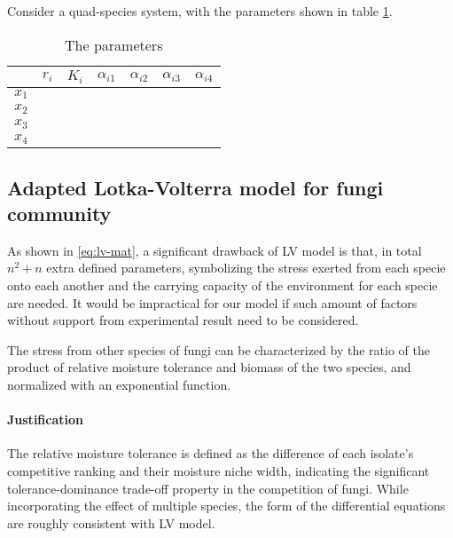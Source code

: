 Consider a quad-species system, with the parameters shown in table \ref{tb:quad-para}.

\begin{table}
    \begin{center}
        \caption{The parameters}
        \begin{tabular}{c|cccccc}
            \toprule
                  & $r_i$ & $K_i$ & $\alpha_{i1}$ & $\alpha_{i2}$ & $\alpha_{i3}$ & $\alpha_{i4}$ \\
            \midrule
            $x_1$ &       &       &               &               &               &               \\
            $x_2$ &       &       &               &               &               &               \\
            $x_3$ &       &       &               &               &               &               \\
            $x_4$ &       &       &               &               &               &               \\
            \bottomrule
        \end{tabular}\label{tb:quad-para}
    \end{center}
\end{table}



\subsection{Adapted Lotka-Volterra model for fungi community}

As shown in \eqref{eq:lv-mat}, a significant drawback of LV model is that, in total $n^2 + n$ extra defined parameters, symbolizing the stress exerted from each specie onto each another and the carrying capacity of the environment for each specie are needed. It would be impractical for our model if such amount of factors without support from experimental result need to be considered.

\begin{definition}
    The stress from other species of fungi can be characterized by the ratio of the product of relative moisture tolerance and biomass of the two species, and normalized with an exponential function.
\end{definition}
\paragraph*{Justification} The relative moisture tolerance is defined as the difference of each isolate’s competitive ranking and their moisture niche width, indicating the significant tolerance-dominance trade-off property in the competition of fungi. While incorporating the effect of multiple species, the form of the differential equations are roughly consistent with LV model.


